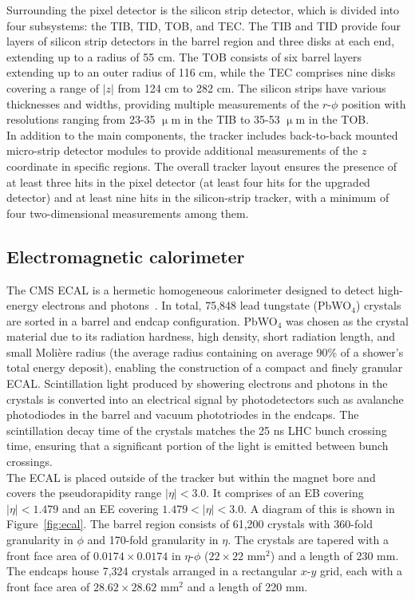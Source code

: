 Surrounding the pixel detector is the silicon strip detector, which is divided into four subsystems: the \ac{TIB}, \ac{TID}, \ac{TOB}, and \ac{TEC}. 
The \ac{TIB} and \ac{TID} provide four layers of silicon strip detectors in the barrel region and three disks at each end, extending up to a radius of 55 cm. 
The \ac{TOB} consists of six barrel layers extending up to an outer radius of 116 cm, while the \ac{TEC} comprises nine disks covering a range of $|z|$ from 124 cm to 282 cm. 
The silicon strips have various thicknesses and widths, providing multiple measurements of the $r$-$\phi$ position with resolutions ranging from 23-35 $\upmu$m in the \ac{TIB} to 35-53 $\upmu$m in the \ac{TOB}. \\

In addition to the main components, the tracker includes back-to-back mounted micro-strip detector modules to provide additional measurements of the $z$ coordinate in specific regions. 
The overall tracker layout ensures the presence of at least three hits in the pixel detector (at least four hits for the upgraded detector) and at least nine hits in the silicon-strip tracker, with a minimum of four two-dimensional measurements among them.

\subsection{Electromagnetic calorimeter}

The \ac{CMS} \ac{ECAL} is a hermetic homogeneous calorimeter designed to detect high-energy electrons and photons~\cite{CMS_Setup,CMS:2013lxn}. 
In total, 75,848 lead tungstate (PbWO$_4$) crystals are sorted in a barrel and endcap configuration. 
PbWO$_4$ was chosen as the crystal material due to its radiation hardness, high density, short radiation length, and small Molière radius (the average radius containing on average 90\% of
a shower’s total energy deposit), enabling the construction of a compact and finely granular \ac{ECAL}. 
Scintillation light produced by showering electrons and photons in the crystals is converted into an electrical signal by photodetectors such as avalanche photodiodes in the barrel and vacuum phototriodes in the endcaps. 
The scintillation decay time of the crystals matches the 25 ns \ac{LHC} bunch crossing time, ensuring that a significant portion of the light is emitted between bunch crossings. \\

The \ac{ECAL} is placed outside of the tracker but within the magnet bore and covers the pseudorapidity range $|\eta| < 3.0$. 
It comprises of an \ac{EB} covering $|\eta| < 1.479$ and an \ac{EE} covering $1.479 < |\eta| < 3.0$. 
A diagram of this is shown in Figure~\ref{fig:ecal}.
The barrel region consists of 61,200 crystals with 360-fold granularity in $\phi$ and 170-fold granularity in $\eta$. 
The crystals are tapered with a front face area of $0.0174 \times 0.0174$ in $\eta$-$\phi$ ($22 \times 22$ mm$^2$) and a length of 230 mm. 
The endcaps house 7,324 crystals arranged in a rectangular $x$-$y$ grid, each with a front face area of $28.62 \times 28.62$ mm$^2$ and a length of 220 mm. \\

